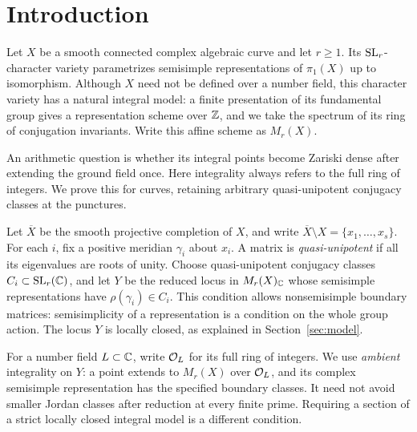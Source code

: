 \section{Introduction}\label{sec:introduction}

Let $X$ be a smooth connected complex algebraic curve and let $r\geq1$.
Its $\operatorname{SL}_r$-character variety parametrizes semisimple representations of
$\pi_1(X)$ up to isomorphism. Although $X$ need not be defined over a number
field, this character variety has a natural integral model: a finite
presentation of its fundamental group gives a representation scheme over
$\mathbb Z$, and we take the spectrum of its ring of conjugation invariants.
Write this affine scheme as $M_r(X)$.

An arithmetic question is whether its integral points become Zariski dense
after extending the ground field once. Here integrality always refers to
the full ring of integers. We prove this for curves, retaining arbitrary
quasi-unipotent conjugacy classes at the punctures.

Let $\overline X$ be the smooth projective completion of $X$, and write
$\overline X\setminus X=\{x_1,\ldots,x_s\}$. For each $i$, fix a positive
meridian $\gamma_i$ about $x_i$. A matrix is \emph{quasi-unipotent} if all
its eigenvalues are roots of unity. Choose quasi-unipotent conjugacy
classes $C_i\subset\operatorname{SL}_r(\mathbb C)$, and let $Y$ be the reduced locus in
$M_r(X)_\mathbb C$ whose semisimple representations have
$\rho(\gamma_i)\in C_i$. This condition allows nonsemisimple boundary
matrices: semisimplicity of a representation is a condition on the whole
group action. The locus $Y$ is locally closed, as explained in
Section~\ref{sec:model}.

For a number field $L\subset\mathbb C$, write $\mathcal O_L$ for its full ring
of integers.  We use \emph{ambient} integrality on $Y$: a point
extends to $M_r(X)$ over $\mathcal O_L$, and its complex semisimple
representation has the specified boundary classes.  It need not
avoid smaller Jordan classes after reduction at every finite prime.
Requiring a section of a strict locally closed integral model is
a different condition.

